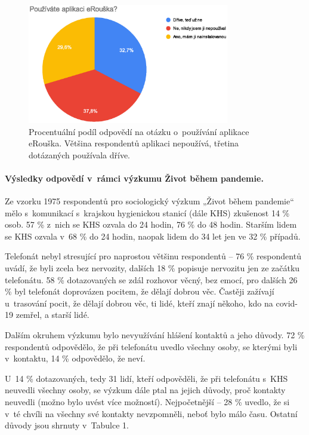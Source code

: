 \begin{figure}
\begin{center}
    \includegraphics[width=250pt]{./pic/graf3.eps}
 \end{center}    
\caption{Procentuální podíl odpovědí na otázku o~používání aplikace eRouška. Většina respondentů aplikaci nepoužívá, třetina dotázaných používala dříve.}
 \end{figure}
 
\paragraph* {Výsledky odpovědí v~rámci výzkumu Život během pandemie.}
Ze vzorku 1975 respondentů pro sociologický výzkum „Život během pandemie“ mělo s~komunikací s~krajskou hygienickou stanicí (dále KHS) zkušenost 14 \% osob. 57 \% z~nich se KHS ozvala do 24 hodin, 76 \% do 48 hodin. Starším lidem se KHS ozvala v~68 \% do 24 hodin, naopak lidem do 34 let jen ve 32 \% případů. 

Telefonát nebyl stresující pro naprostou většinu respondentů -- 76 \% respondentů uvádí, že byli zcela bez nervozity, dalších 18 \% popisuje nervozitu jen ze začátku telefonátu. 58 \% dotazovaných se zdál rozhovor věcný, bez emocí, pro dalších 26 \% byl telefonát doprovázen pocitem, že dělají dobrou věc. Častěji zažívají u~trasování pocit, že dělají dobrou věc, ti lidé, kteří znají někoho, kdo na covid-19 zemřel, a starší lidé.

Dalším okruhem výzkumu bylo nevyužívání hlášení kontaktů a jeho důvody. 72 \% respondentů odpovědělo, že při telefonátu uvedlo všechny osoby, se kterými byli v~kontaktu, 14 \% odpovědělo, že neví. 

U~14 \% dotazovaných, tedy 31 lidí, kteří odpověděli, že při telefonátu s~KHS neuvedli všechny osoby, se výzkum dále ptal na jejich důvody, proč kontakty neuvedli (možno bylo uvést více možností). Nejpočetnější -- 28 \% uvedlo, že si v~té chvíli na všechny své kontakty nevzpomněli, neboť bylo málo času. Ostatní důvody jsou shrnuty v~Tabulce 1.

